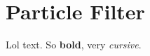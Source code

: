 \documentclass[Main]{subfiles}
\begin{document}
\section{Particle Filter} %
	\label{sec:particlefilter}

	Lol text.
	So \textbf{bold}, very \emph{cursive}.

\end{document}
